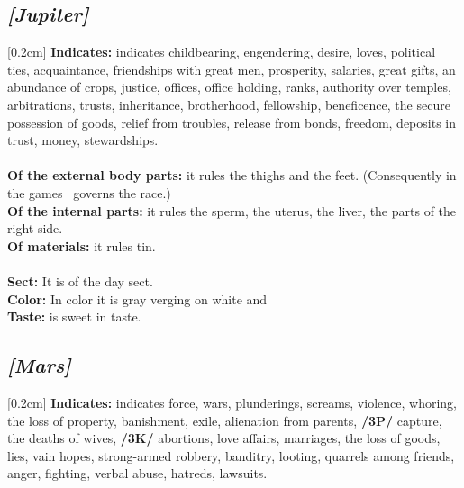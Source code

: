 \secbr
\subsection{\textit{[Jupiter]}}
[0.2cm]
\noindent
\textbf{Indicates:} \Jupiter{} indicates childbearing, engendering, desire, loves, political ties, acquaintance, friendships with great men, prosperity, salaries, great gifts, an abundance of crops, justice, offices, office holding, ranks, authority over temples, arbitrations, trusts, inheritance, brotherhood, fellowship, beneficence, the secure possession of goods, relief from troubles, release from bonds, freedom, deposits in trust, money, stewardships. \\
\\
\textbf{Of the external body parts:} it rules the thighs and the feet. (Consequently in the games \Jupiter\, governs the race.)\\
\textbf{Of the internal parts:}  it rules the sperm, the uterus, the liver, the parts of the right side. \\
\textbf{Of materials:} it rules tin. \\
\\
\textbf{Sect:} It is of the day sect. \\
\textbf{Color:} In color it is gray verging on white and \\
\textbf{Taste:} is sweet in taste.

\secbr
\subsection{\textit{[Mars]}}
[0.2cm]
\noindent
\textbf{Indicates:} \Mars{} indicates force, wars, plunderings, screams, violence, whoring, the loss of property, banishment, exile, alienation from parents, \textbf{/3P/} capture, the deaths of wives, \textbf{/3K/} abortions, love affairs, marriages, the loss of goods, lies, vain hopes, strong-armed robbery, banditry, looting, quarrels among friends, anger, fighting, verbal abuse, hatreds, lawsuits. 


